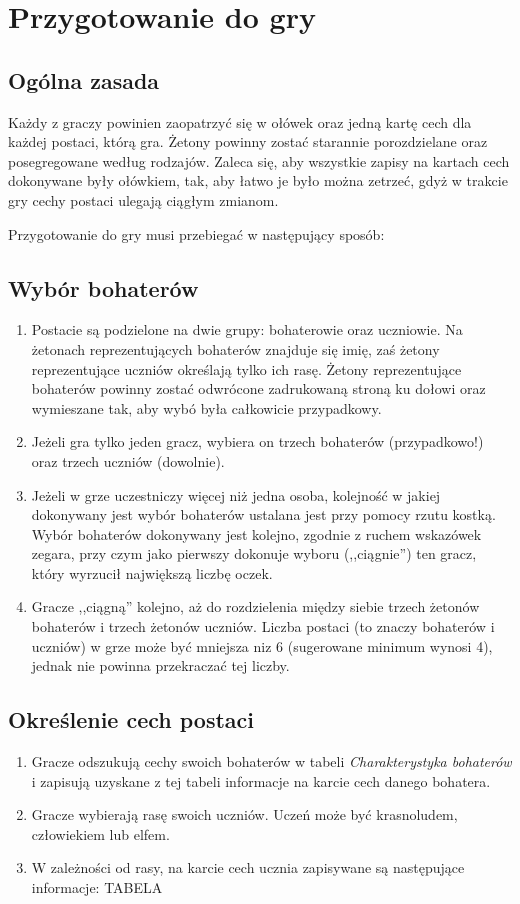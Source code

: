 \section{Przygotowanie do gry}
\subsection{Ogólna zasada}
Każdy z graczy powinien zaopatrzyć się w ołówek oraz jedną kartę cech dla każdej postaci, którą gra.
Żetony powinny zostać starannie porozdzielane oraz posegregowane według rodzajów.
Zaleca się, aby wszystkie zapisy na kartach cech dokonywane były ołówkiem, tak, aby łatwo je było można zetrzeć, gdyż w trakcie gry cechy postaci ulegają ciągłym zmianom.

Przygotowanie do gry musi przebiegać w następujący sposób:

\subsection{Wybór bohaterów}
\begin{enumerate}
    \item Postacie są podzielone na dwie grupy: bohaterowie oraz uczniowie.
        Na żetonach reprezentujących bohaterów znajduje się imię, zaś żetony reprezentujące uczniów określają tylko ich rasę.
        Żetony reprezentujące bohaterów powinny zostać odwrócone zadrukowaną stroną ku dołowi oraz wymieszane tak, aby wybó była całkowicie przypadkowy.
    \item Jeżeli gra tylko jeden gracz, wybiera on trzech bohaterów (przypadkowo!) oraz trzech uczniów (dowolnie).
    \item Jeżeli w grze uczestniczy więcej niż jedna osoba, kolejność w jakiej dokonywany jest wybór bohaterów ustalana jest przy pomocy rzutu kostką.
        Wybór bohaterów dokonywany jest kolejno, zgodnie z ruchem wskazówek zegara, przy czym jako pierwszy dokonuje wyboru (,,ciągnie'') ten gracz, który wyrzucił największą liczbę oczek.
    \item Gracze ,,ciągną'' kolejno, aż do rozdzielenia między siebie trzech żetonów bohaterów i trzech żetonów uczniów.
        Liczba postaci (to znaczy bohaterów i uczniów) w grze może być mniejsza niz 6 (sugerowane minimum wynosi 4), jednak nie powinna przekraczać tej liczby.
\end{enumerate}

\subsection{Określenie cech postaci}
\begin{enumerate}
    \item Gracze odszukują cechy swoich bohaterów w tabeli \textit{Charakterystyka bohaterów} i zapisują uzyskane z tej tabeli informacje na karcie cech danego bohatera.
    \item Gracze wybierają rasę swoich uczniów.
        Uczeń może być krasnoludem, człowiekiem lub elfem.
    \item W zależności od rasy, na karcie cech ucznia zapisywane są następujące informacje:
        TABELA
\end{enumerate}
